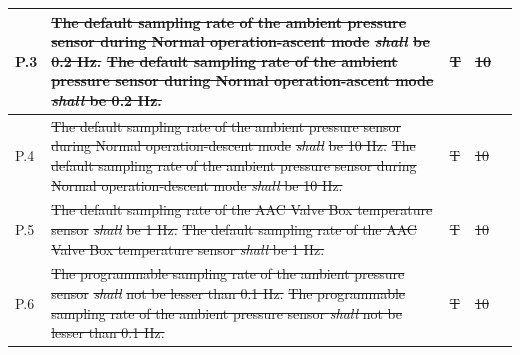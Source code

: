 \documentclass[a4paper,12pt,twoside]{article}
\providecommand{\DIFaddtex}[1]{{\protect\color{blue}\uwave{#1}}} %
\providecommand{\DIFdeltex}[1]{{\protect\color{red}\sout{#1}}}                      %
\providecommand{\DIFaddbegin}{} %
\providecommand{\DIFaddend}{} %
\providecommand{\DIFdelbegin}{} %
\providecommand{\DIFdelend}{} %
\providecommand{\DIFadd}[1]{\texorpdfstring{\DIFaddtex{#1}}{#1}} %
\providecommand{\DIFdel}[1]{\texorpdfstring{\DIFdeltex{#1}}{}} %
\newcommand{\DIFscaledelfig}{0.5}
\newlength{\DIFdelgraphicswidth} %
\newlength{\DIFdelgraphicsheight} %
\newcommand{\DIFaddincludegraphics}[2][]{{\color{blue}\fbox{\DIFOincludegraphics[#1]{#2}}}} %
\newcommand{\DIFdelincludegraphics}[2][]{%
\sbox{\DIFdelgraphicsbox}{\DIFOincludegraphics[#1]{#2}}%
\settoboxwidth{\DIFdelgraphicswidth}{\DIFdelgraphicsbox} %
\settoboxtotalheight{\DIFdelgraphicsheight}{\DIFdelgraphicsbox} %
\scalebox{\DIFscaledelfig}{%
\parbox[b]{\DIFdelgraphicswidth}{\usebox{\DIFdelgraphicsbox}\\[-\baselineskip] \rule{\DIFdelgraphicswidth}{0em}}\llap{\resizebox{\DIFdelgraphicswidth}{\DIFdelgraphicsheight}{%
\setlength{\unitlength}{\DIFdelgraphicswidth}%
\begin{picture}(1,1)%
\thicklines\linethickness{2pt} %
{\color[rgb]{1,0,0}\put(0,0){\framebox(1,1){}}}%
{\color[rgb]{1,0,0}\put(0,0){\line( 1,1){1}}}%
{\color[rgb]{1,0,0}\put(0,1){\line(1,-1){1}}}%
\end{picture}%
}\hspace*{3pt}}} %
} %
\DeclareRobustCommand{\DIFaddbegin}{\DIFOaddbegin \let\includegraphics\DIFaddincludegraphics} %
\DeclareRobustCommand{\DIFaddend}{\DIFOaddend \let\includegraphics\DIFOincludegraphics} %
\DeclareRobustCommand{\DIFdelbegin}{\DIFOdelbegin \let\includegraphics\DIFdelincludegraphics} %
\DeclareRobustCommand{\DIFdelend}{\DIFOaddend \let\includegraphics\DIFOincludegraphics} %
\begin{document}
\begin{longtable}[]{|m{}| m{} |m{} |m{}|m{}|}
P.3  & \DIFdelbegin \DIFdel{The default sampling rate of the ambient pressure sensor during Normal operation-ascent mode }\textit{\DIFdel{shall}} %
\DIFdel{be 0.2 Hz.                                                           }\DIFdelend \DIFaddbegin \st{The default sampling rate of the ambient pressure sensor during Normal operation-ascent mode \textit{shall} be 0.2 Hz.}\DIFadd{\textsuperscript{\ref{replaceSoftVeri}}                                                           }\DIFaddend &    \DIFdelbegin \DIFdel{T        }\DIFdelend \DIFaddbegin \DIFadd{-        }\DIFaddend & \DIFdelbegin \DIFdel{10            }\DIFdelend \DIFaddbegin \DIFadd{-        }\DIFaddend &        \\ \hline
P.4  & \DIFdelbegin \DIFdel{The default sampling rate of the ambient pressure sensor during Normal operation-descent mode }\textit{\DIFdel{shall}} %
\DIFdel{be 10 Hz.                                                           }\DIFdelend \DIFaddbegin \st{The default sampling rate of the ambient pressure sensor during Normal operation-descent mode \textit{shall} be 10 Hz.}\DIFadd{\textsuperscript{\ref{replaceSoftVeri}}                                                           }\DIFaddend &   \DIFdelbegin \DIFdel{T       }\DIFdelend \DIFaddbegin \DIFadd{-     }\DIFaddend & \DIFdelbegin \DIFdel{10            }\DIFdelend \DIFaddbegin \DIFadd{-    }\DIFaddend &        \\ \hline
P.5  & \DIFdelbegin \DIFdel{The default sampling rate of the AAC Valve Box temperature sensor }\textit{\DIFdel{shall}} %
\DIFdel{be 1 Hz.                                                                                        }\DIFdelend \DIFaddbegin \st{The default sampling rate of the AAC Valve Box temperature sensor \textit{shall} be 1 Hz.}\DIFadd{\textsuperscript{\ref{replaceSoftVeri}}                                                                                        }\DIFaddend &     \DIFdelbegin \DIFdel{T        }\DIFdelend \DIFaddbegin \DIFadd{-        }\DIFaddend &  \DIFdelbegin \DIFdel{10            }\DIFdelend \DIFaddbegin \DIFadd{-            }\DIFaddend &        \\ \hline
P.6  &\DIFdelbegin \DIFdel{The programmable sampling rate of the ambient pressure sensor }\textit{\DIFdel{shall}} %
\DIFdel{not be lesser than 0.1 Hz.                                                                          }\DIFdelend \DIFaddbegin \st{ The programmable sampling rate of the ambient pressure sensor \textit{shall} not be lesser than 0.1 Hz.}\DIFadd{\textsuperscript{\ref{replaceSoftVeri}}                                                                          }\DIFaddend &      \DIFdelbegin \DIFdel{T        }\DIFdelend \DIFaddbegin \DIFadd{-    }\DIFaddend & \DIFdelbegin \DIFdel{10            }\DIFdelend \DIFaddbegin \DIFadd{-            }\DIFaddend &        \\ \hline

\end{longtable}
\end{document}

